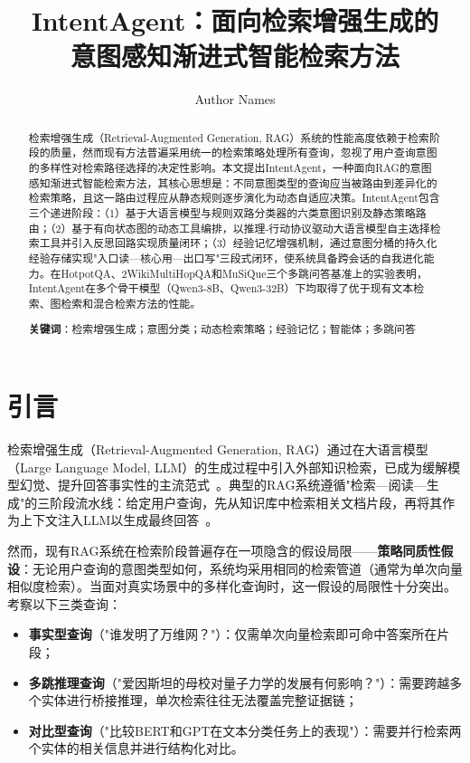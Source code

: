\documentclass[runningheads]{llncs}
\begin{document}
\title{IntentAgent：面向检索增强生成的\\意图感知渐进式智能检索方法}

\author{Author Names}

\maketitle

\begin{abstract}
检索增强生成（Retrieval-Augmented Generation, RAG）系统的性能高度依赖于检索阶段的质量，然而现有方法普遍采用统一的检索策略处理所有查询，忽视了用户查询意图的多样性对检索路径选择的决定性影响。本文提出IntentAgent，一种面向RAG的意图感知渐进式智能检索方法，其核心思想是：不同意图类型的查询应当被路由到差异化的检索策略，且这一路由过程应从静态规则逐步演化为动态自适应决策。IntentAgent包含三个递进阶段：（1）基于大语言模型与规则双路分类器的六类意图识别及静态策略路由；（2）基于有向状态图的动态工具编排，以推理-行动协议驱动大语言模型自主选择检索工具并引入反思回路实现质量闭环；（3）经验记忆增强机制，通过意图分桶的持久化经验存储实现"入口读—核心用—出口写"三段式闭环，使系统具备跨会话的自我进化能力。在HotpotQA、2WikiMultiHopQA和MuSiQue三个多跳问答基准上的实验表明，IntentAgent在多个骨干模型（Qwen3-8B、Qwen3-32B）下均取得了优于现有文本检索、图检索和混合检索方法的性能。

\textbf{关键词}：检索增强生成；意图分类；动态检索策略；经验记忆；智能体；多跳问答
\end{abstract}

\section{引言}

检索增强生成（Retrieval-Augmented Generation, RAG）通过在大语言模型（Large Language Model, LLM）的生成过程中引入外部知识检索，已成为缓解模型幻觉、提升回答事实性的主流范式~\cite{ref1}。典型的RAG系统遵循"检索—阅读—生成"的三阶段流水线：给定用户查询，先从知识库中检索相关文档片段，再将其作为上下文注入LLM以生成最终回答~\cite{ref2}。

然而，现有RAG系统在检索阶段普遍存在一项隐含的假设局限——\textbf{策略同质性假设}：无论用户查询的意图类型如何，系统均采用相同的检索管道（通常为单次向量相似度检索）。当面对真实场景中的多样化查询时，这一假设的局限性十分突出。考察以下三类查询：

\begin{itemize}[leftmargin=*]
    \item \textbf{事实型查询}（"谁发明了万维网？"）：仅需单次向量检索即可命中答案所在片段；
    \item \textbf{多跳推理查询}（"爱因斯坦的母校对量子力学的发展有何影响？"）：需要跨越多个实体进行桥接推理，单次检索往往无法覆盖完整证据链；
    \item \textbf{对比型查询}（"比较BERT和GPT在文本分类任务上的表现"）：需要并行检索两个实体的相关信息并进行结构化对比。
\end{itemize}
\end{document}
